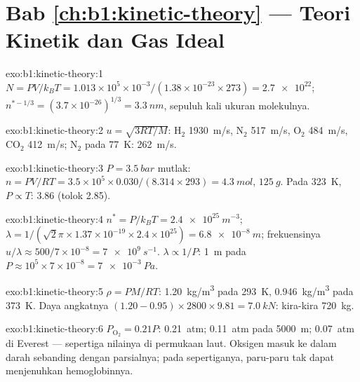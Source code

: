 \section*{Bab \ref{ch:b1:kinetic-theory} --- Teori Kinetik dan Gas Ideal}

\begin{solution}{exo:b1:kinetic-theory:1}
$N = PV/k_BT = 1.013\times10^5 \times 10^{-3}/(1.38\times10^{-23} \times 273) =
\num{2.7e22}$; $n^{*-1/3} = (3.7\times10^{-26})^{1/3} = \qty{3.3}{nm}$, sepuluh
kali ukuran molekulnya.
\end{solution}

\begin{solution}{exo:b1:kinetic-theory:2}
$u = \sqrt{3RT/M}$: H$_2$ \qty{1930}{m/s}, N$_2$ \qty{517}{m/s}, O$_2$
\qty{484}{m/s}, CO$_2$ \qty{412}{m/s}; N$_2$ pada \qty{77}{K}: \qty{262}{m/s}.
\end{solution}

\begin{solution}{exo:b1:kinetic-theory:3}
$P = \qty{3.5}{bar}$ mutlak: $n = PV/RT = 3.5\times10^5 \times 0.030/(8.314
\times 293) = \qty{4.3}{mol}$, $\qty{125}{g}$. Pada \qty{323}{K}, $P \propto T$:
\qty{3.86}{} (tolok \qty{2.85}{}).
\end{solution}

\begin{solution}{exo:b1:kinetic-theory:4}
$n^* = P/k_BT = \qty{2.4e25}{m^{-3}}$; $\lambda = 1/(\sqrt2\pi \times 1.37\times
10^{-19} \times 2.4\times10^{25}) = \qty{6.8e-8}{m}$; frekuensinya $u/\lambda \approx
500/7\times10^{-8} = \qty{7e9}{s^{-1}}$. $\lambda \propto 1/P$: \qty{1}{m} pada
$P \approx 10^5 \times 7\times10^{-8} = \qty{7e-3}{Pa}$.
\end{solution}

\begin{solution}{exo:b1:kinetic-theory:5}
$\rho = PM/RT$: \qty{1.20}{kg/m^3} pada \qty{293}{K}, \qty{0.946}{kg/m^3} pada
\qty{373}{K}. Daya angkatnya $(1.20 - 0.95) \times 2800 \times 9.81 = \qty{7.0}{kN}$:
kira-kira \qty{720}{kg}.
\end{solution}

\begin{solution}{exo:b1:kinetic-theory:6}
$P_{\mathrm{O}_2} = 0.21P$: \qty{0.21}{atm}; \qty{0.11}{atm} pada \qty{5000}{m};
\qty{0.07}{atm} di Everest --- sepertiga nilainya di permukaan laut. Oksigen masuk ke
dalam darah sebanding dengan  parsialnya; pada sepertiganya, paru-paru
tak dapat menjenuhkan hemoglobinnya.
\end{solution}

